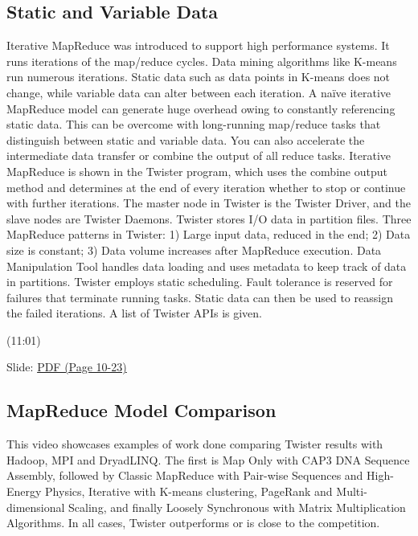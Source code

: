 \subsection{Static and Variable Data}

Iterative MapReduce was introduced to support high performance systems.
It runs iterations of the map/reduce cycles. Data mining algorithms like
K-means run numerous iterations. Static data such as data points in
K-means does not change, while variable data can alter between each
iteration. A naïve iterative MapReduce model can generate huge overhead
owing to constantly referencing static data. This can be overcome with
long-running map/reduce tasks that distinguish between static and
variable data. You can also accelerate the intermediate data transfer or
combine the output of all reduce tasks. Iterative MapReduce is shown in
the Twister program, which uses the combine output method and determines
at the end of every iteration whether to stop or continue with further
iterations. The master node in Twister is the Twister Driver, and the
slave nodes are Twister Daemons. Twister stores I/O data in partition
files. Three MapReduce patterns in Twister: 1) Large input data, reduced
in the end; 2) Data size is constant; 3) Data volume increases after
MapReduce execution. Data Manipulation Tool handles data loading and
uses metadata to keep track of data in partitions. Twister employs
static scheduling. Fault tolerance is reserved for failures that
terminate running tasks. Static data can then be used to reassign the
failed iterations. A list of Twister APIs is given.




  (11:01)

  Slide:
  \href{https://drive.google.com/open?id=0B88HKpainTSfMFBaNHprbWJwQms}{PDF
  (Page 10-23)}


\subsection{MapReduce Model
Comparison}

This video showcases examples of work done comparing Twister results
with Hadoop, MPI and DryadLINQ. The first is Map Only with CAP3 DNA
Sequence Assembly, followed by Classic MapReduce with Pair-wise
Sequences and High-Energy Physics, Iterative with K-means clustering,
PageRank and Multi-dimensional Scaling, and finally Loosely Synchronous
with Matrix Multiplication Algorithms. In all cases, Twister outperforms
or is close to the competition.




